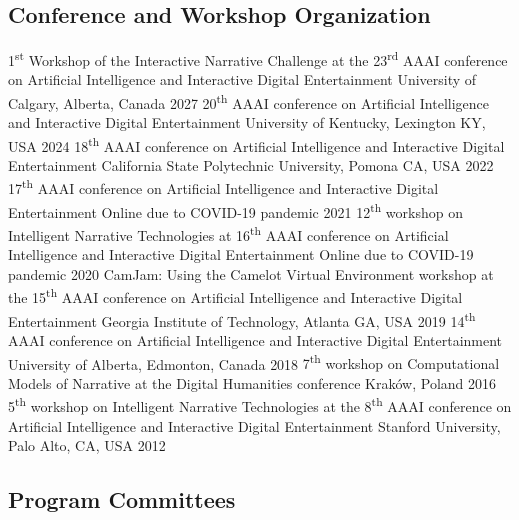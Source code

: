 \documentclass{cv}
\begin{document}
\subsection*{Conference and Workshop Organization}
	{1\textsuperscript{st} Workshop of the Interactive Narrative Challenge at the 23\textsuperscript{rd} AAAI conference on Artificial Intelligence and Interactive Digital Entertainment}
	{University of Calgary, Alberta, Canada}
	{2027}
	{20\textsuperscript{th} AAAI conference on Artificial Intelligence and Interactive Digital Entertainment}
	{University of Kentucky, Lexington KY, USA}
	{2024}
	{18\textsuperscript{th} AAAI conference on Artificial Intelligence and Interactive Digital Entertainment}
	{California State Polytechnic University, Pomona CA, USA}
	{2022}
	{17\textsuperscript{th} AAAI conference on Artificial Intelligence and Interactive Digital Entertainment}
	{Online due to COVID-19 pandemic}
	{2021}
	{12\textsuperscript{th} workshop on Intelligent Narrative Technologies at 16\textsuperscript{th} AAAI conference on Artificial Intelligence and Interactive Digital Entertainment}
	{Online due to COVID-19 pandemic}
	{2020}
	{CamJam: Using the Camelot Virtual Environment workshop at the 15\textsuperscript{th} AAAI conference on Artificial Intelligence and Interactive Digital Entertainment}
	{Georgia Institute of Technology, Atlanta GA, USA}
	{2019}
	{14\textsuperscript{th} AAAI conference on Artificial Intelligence and Interactive Digital Entertainment}
	{University of Alberta, Edmonton, Canada}
	{2018}
	{7\textsuperscript{th} workshop on Computational Models of Narrative at the Digital Humanities conference}
	{Kraków, Poland}
	{2016}
	{5\textsuperscript{th} workshop on Intelligent Narrative Technologies at the 8\textsuperscript{th} AAAI conference on Artificial Intelligence and Interactive Digital Entertainment}
	{Stanford University, Palo Alto, CA, USA}
	{2012}

\subsection*{Program Committees}
\end{document}
